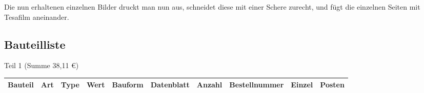 \documentclass[a4paper]{article}
\begin{document}
Die nun erhaltenen einzelnen Bilder druckt man nun aus, schneidet diese mit einer Schere zurecht, und fügt die einzelnen Seiten mit Tesafilm aneinander.

\newpage


\subsection{Bauteilliste}


Teil 1 (Summe 38,11	\euro)


{\tiny
\begin{tabular}{llllllllll}

	\hline
	\textbf{Bauteil} & \textbf{Art} & \textbf{Type} &\textbf{Wert} &\textbf{Bauform} &\textbf{Datenblatt} &\textbf{Anzahl}  &\textbf{Bestellnummer} &\textbf{Einzel} &\textbf{Posten} \\
	\hline
	

\end{tabular}}
\end{document}
